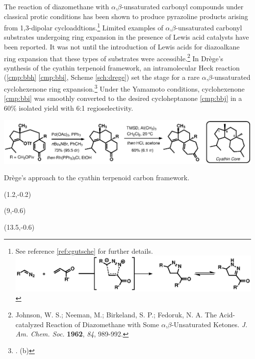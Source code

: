 The reaction of diazomethane with $\alpha$,$\beta$-unsaturated carbonyl compounds under classical
protic conditions has been shown to produce pyrazoline products arising from 1,3-dipolar
cycloaddtions.\footnote{See reference \ref{ref:cgutsche} for further details.\\
\includegraphics[scale=0.7]{chp_singlecarbon/images/alphabetaunsat}} Limited examples of
$\alpha$,$\beta$-unsaturated carbonyl substrates undergoing ring expansion in the presence of Lewis
acid catalysts have been reported. It was not until the introduction of
Lewis acids for diazoalkane ring expansion that these types of substrates
were accessible.\footnote{{\frenchspacing Johnson, W.
S.; Neeman, M.; Birkeland, S. P.; Fedoruk, N. A. The Acid-catalyzed Reaction of Diazomethane with Some
$\alpha$,$\beta$-Unsaturated Ketones. \textit{J. Am. Chem. Soc.} \textbf{1962}, \textit{84},
989-992.}} In Dr\`ege's synthesis of the cyathin terpenoid framework, an intramolecular Heck
reaction (\ref{cmp:bbh} \ce{->} \ref{cmp:bbi}, Scheme \ref{sch:drege}) set the stage for a rare
$\alpha$,$\beta$-unsaturated cyclohexenone ring expansion.\footnote{. (b) }  Under the Yamamoto conditions,
cyclohexenone \ref{cmp:bbi} was smoothly converted to the desired cycloheptanone \ref{cmp:bbj} in a
60\% isolated yield with 6:1 regioselectivity.

\begin{Scheme}[t]
  \centering \includegraphics[scale=0.8]{chp_singlecarbon/images/drege}
  \caption{Dr\`ege's approach to the cyathin terpenoid carbon framework.}
\begin{textblock}{1}(1.2,-0.2)  \end{textblock}
\begin{textblock}{1}(9,-0.6)  \end{textblock}
\begin{textblock}{1}(13.5,-0.6)  \end{textblock}
  \label{sch:drege}
\end{Scheme}

